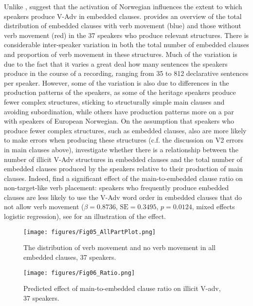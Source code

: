 \documentclass[output=paper]{langscibook}
\begin{document}
Unlike \citeauthor{LarssonJohannessen2015Incomplete}, \citet{JensbergEtAl2024} suggest that the activation of Norwegian influences the extent to which speakers produce V-Adv in embedded clauses.  \citep{JensbergEtAl2024} provides an overview of the total distribution of embedded clauses with verb movement (blue) and those without verb movement (red) in the 37 speakers who produce relevant structures. There is considerable inter-speaker variation in both the total number of embedded clauses and proportion of verb movement in these structures. Much of the variation is due to the fact that it varies a great deal how many sentences the speakers produce in the course of a recording, ranging from 35 to 812 declarative sentences per speaker. However, some of the variation is also due to differences in the production patterns of the speakers, as some of the heritage speakers produce fewer complex structures, sticking to structurally simple main clauses and avoiding subordination, while others have production patterns more on a par with speakers of European Norwegian. On the assumption that speakers who produce fewer complex structures, such as embedded clauses, also are more likely to make errors when producing these structures (c.f. the discussion on V2 errors in main clauses above), \citet{JensbergEtAl2024} investigate whether there is a relationship between the number of illicit V-Adv structures in embedded clauses and the total number of embedded clauses produced by the speakers relative to their production of main clauses. Indeed, \citet{JensbergEtAl2024} find a significant effect of the main-to-embedded clause ratio on non-target-like verb placement: speakers who frequently produce embedded clauses are less likely to use the V-Adv word order in embedded clauses that do not allow verb movement ($\beta = 0.8736$, $\text{SE} = 0.3495$, $p =0.0124$, mixed effects logistic regression), see  for an illustration of the effect. 

\begin{figure}
\texttt{[image: figures/Fig05\_AllPartPlot.png]}
\caption{The distribution of verb movement and no verb movement in all embedded clauses, 37 speakers.}
\label{fig:anderssen:4}
\end{figure}

\begin{figure}
\texttt{[image: figures/Fig06\_Ratio.png]}
\caption{Predicted effect of main-to-embedded clause ratio on illicit V-adv, 37 speakers.}
\label{fig:anderssen:5}
\end{figure}
\end{document}
